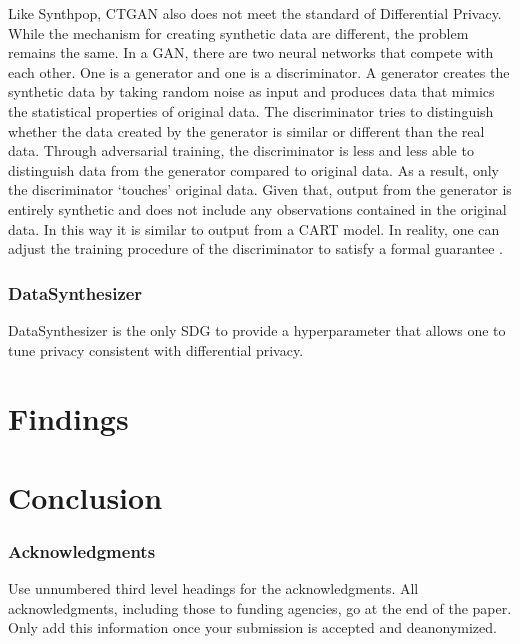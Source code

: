 \documentclass[runningheads]{llncs}
\begin{document}
Like Synthpop, CTGAN also does not meet the standard of Differential Privacy.  While the mechanism for creating synthetic data are different, the problem remains the same.  In a GAN, there are two neural networks that compete with each other.  One is a generator and one is a discriminator.  A generator creates the synthetic data by taking random noise as input and produces data that mimics the statistical properties of original data.  The discriminator tries to distinguish whether the data created by the generator is similar or different than the real data.  Through adversarial training, the discriminator is less and less able to distinguish data from the generator compared to original data.  As a result, only the discriminator `touches' original data.  Given that, output from the generator is entirely synthetic and does not include any observations contained in the original data.  In this way it is similar to output from a CART model.  In reality, one can adjust the training procedure of the discriminator to satisfy a formal guarantee \cite{beaulieu2019privacy,neunhoeffer2020private}.

\subsubsection{DataSynthesizer} 

DataSynthesizer is the only SDG to provide a hyperparameter that allows one to tune privacy consistent with differential privacy.

\section{Findings}\label{sec:findings}


\section{Conclusion}\label{sec:conclusion}


\subsubsection*{Acknowledgments}
Use unnumbered third level headings for the acknowledgments. All acknowledgments, including those to funding agencies, go at the end of the paper. Only add this information once your submission is accepted and deanonymized. 

\clearpage


\clearpage


\clearpage



\clearpage
\appendix

\end{document}
